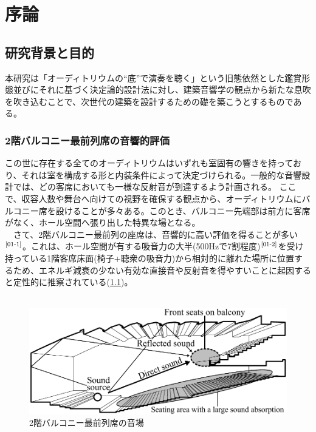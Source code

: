 \chapter{序論}
\thispagestyle{fancy}
\nobreak
\section{研究背景と目的}
本研究は「オーディトリウムの“底”で演奏を聴く」という旧態依然とした鑑賞形態並びにそれに基づく決定論的設計法に対し、建築音響学の観点から新たな息吹を吹き込むことで、次世代の建築を設計するための礎を築こうとするものである。

\subsection{2階バルコニー最前列席の音響的評価}
この世に存在する全てのオーディトリウムはいずれも室固有の響きを持っており、それは室を構成する形と内装条件によって決定づけられる。一般的な音響設計では、どの客席においても一様な反射音が到達するよう計画される。
ここで、収容人数や舞台へ向けての視野を確保する観点から、オーディトリウムにバルコニー席を設けることが多々ある。このとき、バルコニー先端部は前方に客席がなく、ホール空間へ張り出した特異な場となる。
\\　さて、2階バルコニー最前列の座席は、音響的に高い評価を得ることが多い$^{\text{\cite{01-1}}}$。これは、ホール空間が有する吸音力の大半(500Hzで7割程度)$^{\text{\cite{01-2}}}$を受け持っている1階客席床面(椅子+聴衆の吸音力)から相対的に離れた場所に位置するため、エネルギ減衰の少ない有効な直接音や反射音を得やすいことに起因すると定性的に推察されている(\ref{fig:2階バルコニー最前列席の音場})。
\\
\\
\begin{figure}[h]
    \centering
    \includegraphics[keepaspectratio,scale=0.8]{01_att/second_balcony.pdf}
    \caption{\hspace{1mm}2階バルコニー最前列席の音場}
    \label{fig:2階バルコニー最前列席の音場}
\end{figure}

